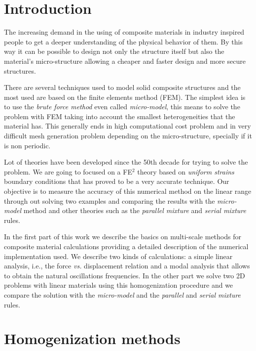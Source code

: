 \documentclass[review]{elsarticle}
\begin{document}
\linenumbers

\section{Introduction}

The increasing demand in the using of composite materials in industry inspired people
to get a deeper understanding of the physical behavior of them. By this way it
can be possible to design not only the structure itself but also the material's
micro-structure allowing a cheaper and faster design and more secure structures.

There are several techniques used to model solid composite structures and the
most used are based on the finite elements method (FEM).
The simplest idea is to use the \emph{brute force method}
even called \emph{micro-model}, this means to solve the problem with FEM
taking into account the smallest heterogeneities that the material has.
This generally ends in high computational cost problem and in very difficult mesh
generation problem depending on the micro-structure, specially if it is non
periodic.

Lot of theories have been developed since the 50th decade for trying to solve
the problem. We are going to focused on a FE$^2$ theory based on
\emph{uniform strains} boundary conditions that has proved to be a very accurate technique.
Our objective is to measure the accuracy of this numerical method on the linear 
range through out solving two examples and comparing the results with the 
\emph{micro-model} method and other theories such as the \emph{parallel mixture} 
and \emph{serial mixture} rules. 

In the first part of this work we describe the basics on multi-scale methods
for composite material calculations providing a detailed description of the
numerical implementation used. We describe two kinds of calculations: a simple
linear analysis, i.e., the force \emph{vs.} displacement relation
and a modal analysis that allows to obtain the natural oscillations
frequencies.
In the other part we solve two 2D problems with linear materials using this 
homogenization procedure and we compare the solution with the \emph{micro-model} 
and the \emph{parallel} and \emph{serial mixture} rules. 

\section{Homogenization methods}
\end{document}
